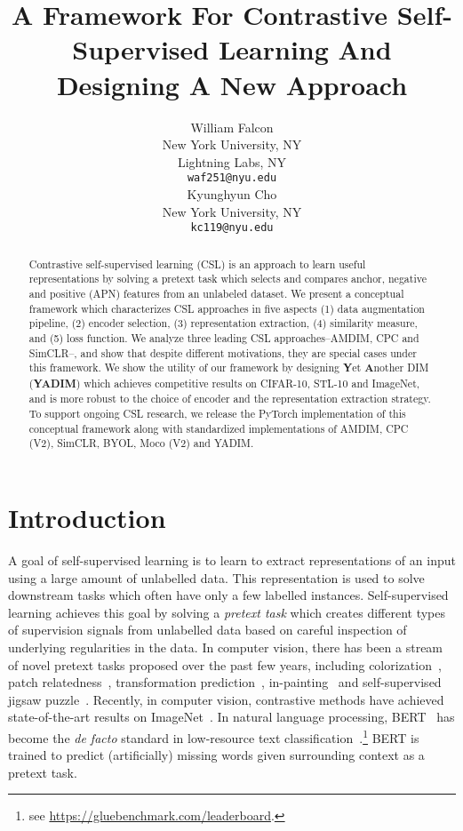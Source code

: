 \documentclass{article}
\title{A Framework For Contrastive Self-Supervised Learning And Designing A New Approach}
\author{William Falcon\\
  New York University, NY\\
  Lightning Labs, NY \\
  \texttt{waf251@nyu.edu} \\
\And
   Kyunghyun Cho \\
   New York University, NY\\
  \texttt{kc119@nyu.edu} \\
}
\begin{document}
\maketitle

\begin{abstract}
    Contrastive self-supervised learning (CSL) is an approach to learn useful representations by solving a pretext task which selects and compares anchor, negative and positive (APN) features from an unlabeled dataset. We present a conceptual framework which characterizes CSL approaches in five aspects (1) data augmentation pipeline, (2) encoder selection, (3) representation extraction, (4) similarity measure, and (5) loss function. We analyze three leading CSL approaches--AMDIM, CPC and SimCLR--, and show that despite different motivations, they are special cases under this framework. We show the utility of our framework by designing \textbf{Y}et \textbf{A}nother DIM (\textbf{YADIM}) which achieves competitive results on CIFAR-10, STL-10 and ImageNet, and is more robust to the choice of encoder and the representation extraction strategy. To support ongoing CSL research, we release the PyTorch implementation of this conceptual framework along with standardized implementations of AMDIM, CPC (V2), SimCLR, BYOL, Moco (V2) and YADIM.
\end{abstract}

\section{Introduction}
A goal of self-supervised learning is to learn to extract representations of an input using a large amount of unlabelled data. This representation is used to solve downstream tasks which often have only a few labelled instances. Self-supervised learning achieves this goal by solving a \textit{pretext task} which creates different types of supervision signals from unlabelled data based on careful inspection of underlying regularities in the data. In computer vision, there has been a stream of novel pretext tasks proposed over the past few years, including colorization~\cite{zhang2016colorful}, patch relatedness~\cite{doersch2015unsupervised,isola2015learning}, transformation prediction~\cite{agrawal2015learning,gidaris2018unsupervised}, in-painting~\cite{pathak2016context} and self-supervised jigsaw puzzle~\cite{noroozi2016unsupervised}. Recently, in computer vision, contrastive methods have achieved state-of-the-art results on ImageNet~\cite{hjelm2018learning,henaff2019data,chen2020simple,tian2019contrastive,he2019momentum}. In natural language processing, BERT~\cite{devlin2018bert} has become the {\it de facto} standard in low-resource text classification~\cite{liu2019roberta}.\footnote{
    see \url{https://gluebenchmark.com/leaderboard}.
} 
BERT is trained to predict (artificially) missing words given surrounding context as a pretext task. 
\end{document}
